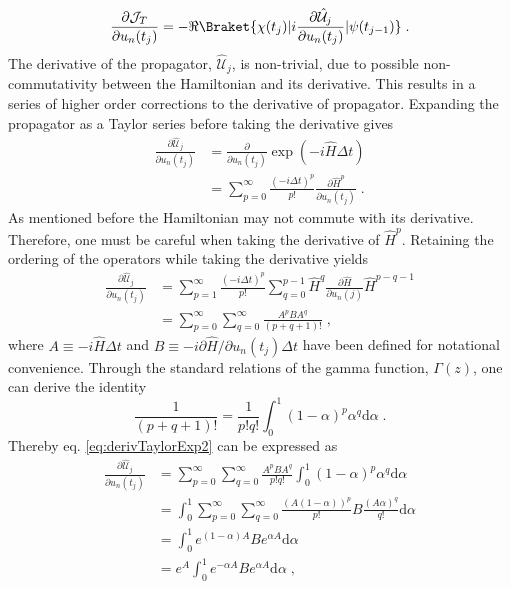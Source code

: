 \begin{equation}
	\frac{\partial \mathcal{J}_T}{\partial u_n (t_j)} = - \Re \Braket{\chi (t_j) | i \frac{ \partial \hat{\mathcal{U}}_{j}}{\partial u_n (t_j)} | \psi (t_{j-1})} \; .
	\label{eq:gradientForBack}
\end{equation}
The derivative of the propagator, $\hat{\mathcal{U}}_{j}$, is non-trivial, due to possible non-commutativity between the Hamiltonian and its derivative. This results in a series of higher order corrections to the derivative of propagator.
Expanding the propagator as a Taylor series before taking the derivative gives
\begin{align}
	\frac{\partial \hat{\mathcal{U}}_{j}}{\partial u_n (t_j)} &= \frac{\partial}{\partial u_n (t_j)}  \exp \left( -i \hat{H} \Delta t \right) \nonumber \\
	&= \sum_{p = 0}^{\infty} \frac{( -i \Delta t  )^p}{p!} \frac{\partial \hat{H}^p}{\partial u_n (t_j)} \; .  
	\label{eq:derivTaylorExp}
\end{align}
As mentioned before the Hamiltonian may not commute with its derivative. Therefore, one must be careful when taking the derivative of $\hat{H}^p$. Retaining the ordering of the operators while taking the derivative yields
\begin{align}
	\frac{\partial \hat{\mathcal{U}}_{j}}{\partial u_n (t_j)} &= \sum_{p=1}^{\infty} \frac{ \left( -i \Delta t \right) ^p }{p!} \sum_{q=0}^{p-1} \hat{H}^q \frac{\partial \hat{H}}{\partial u_n (j)} \hat{H}^{p-q-1} \nonumber \\
	&= \sum_{p=0}^{\infty} \sum_{q=0}^{\infty} \frac{A^p B A^q}{(p+q+1)!} \; , \label{eq:derivTaylorExp2}
\end{align} 
where $A \equiv -i \hat{H} \Delta t$ and $B \equiv -i \partial \hat{H}/\partial u_n (t_j) \Delta t$ have been defined for notational convenience. Through the standard relations of the gamma function, $\Gamma (z)$, one can derive the identity
\begin{equation}
	\frac{1}{(p+q+1)!} = \frac{1}{p! q !} \int_{0}^{1} (1-\alpha)^p \alpha^q \mathrm{d}\alpha \; .
\end{equation}
Thereby eq. \eqref{eq:derivTaylorExp2} can be expressed as
\begin{align}
	\frac{\partial \hat{\mathcal{U}}_{j}}{\partial u_n (t_j)} &= \sum_{p=0}^{\infty} \sum_{q=0}^{\infty} \frac{A^p B A^q}{p! q !}  \int_{0}^{1} (1-\alpha)^p \alpha^q \mathrm{d}\alpha \nonumber \\
	&= \int_{0}^{1} \sum_{p=0}^{\infty} \sum_{q=0}^{\infty} \frac{(A (1- \alpha))^p}{p!} B \frac{(A \alpha)^q}{q!}  \mathrm{d}\alpha \nonumber \\
	&= \int_{0}^{1} e^{ (1- \alpha) A} B e^{ \alpha A} \mathrm{d}\alpha \nonumber \\
	 &= e^A \int_{0}^{1} e^{ - \alpha A} B e^{ \alpha A} \mathrm{d}\alpha \; , \label{eq:eq:derivTaylorExp3}
\end{align}
